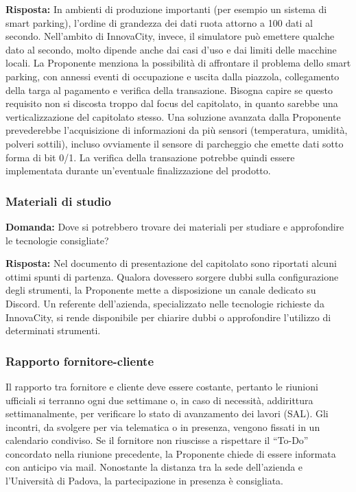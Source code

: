 \textbf{Risposta:} In ambienti di produzione importanti (per esempio un sistema di smart parking), l’ordine di grandezza dei dati ruota attorno a 100 dati al secondo. Nell'ambito di InnovaCity, invece, il simulatore può emettere qualche dato al secondo, molto dipende anche dai casi d'uso e dai limiti delle macchine locali. La Proponente menziona la possibilità di affrontare il problema dello smart parking, con annessi eventi di occupazione e uscita dalla piazzola, collegamento della targa al pagamento e verifica della transazione.
Bisogna capire se questo requisito non si discosta troppo dal focus del capitolato, in quanto sarebbe una verticalizzazione del capitolato stesso. Una soluzione avanzata dalla Proponente prevederebbe l’acquisizione di informazioni da più sensori (temperatura, umidità, polveri sottili), incluso ovviamente il sensore di parcheggio che emette dati sotto forma di bit 0/1. La verifica della transazione potrebbe quindi essere implementata durante un’eventuale finalizzazione del prodotto.

\subsubsection{Materiali di studio}
\textbf{Domanda:} Dove si potrebbero trovare dei materiali per studiare e approfondire le tecnologie consigliate?

\textbf{Risposta:} Nel documento di presentazione del capitolato sono riportati alcuni ottimi spunti di partenza. Qualora dovessero sorgere dubbi sulla configurazione degli strumenti, la Proponente mette a disposizione un canale dedicato su Discord. Un referente dell’azienda, specializzato nelle tecnologie richieste da InnovaCity, si rende disponibile per chiarire dubbi o approfondire l’utilizzo di determinati strumenti.

\subsubsection{Rapporto fornitore-cliente}
Il rapporto tra fornitore e cliente deve essere costante, pertanto le riunioni ufficiali si terranno ogni due settimane o, in caso di necessità, addirittura settimanalmente, per verificare lo stato di avanzamento dei lavori (SAL). Gli incontri, da svolgere per via telematica o in presenza, vengono fissati in un calendario condiviso. Se il fornitore non riuscisse a rispettare il “To-Do” concordato nella riunione precedente, la Proponente chiede di essere informata con anticipo via mail. Nonostante la distanza tra la sede dell’azienda e l’Università di Padova, la partecipazione in presenza è consigliata.

